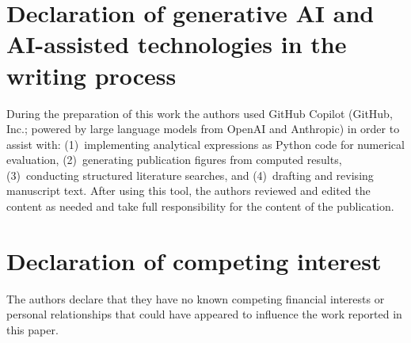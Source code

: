 \documentclass[review]{elsarticle}
\begin{document}
\section*{Declaration of generative AI and AI-assisted technologies in the
writing process}
During the preparation of this work the authors used GitHub Copilot (GitHub,
Inc.; powered by large language models from OpenAI and Anthropic) in order to
assist with: (1)~implementing analytical expressions as Python code for
numerical evaluation, (2)~generating publication figures from computed results,
(3)~conducting structured literature searches, and (4)~drafting and revising
manuscript text.  After using this tool, the authors reviewed and edited the
content as needed and take full responsibility for the content of the
publication.

\section*{Declaration of competing interest}
The authors declare that they have no known competing financial interests
or personal relationships that could have appeared to influence the work
reported in this paper.
\end{document}
